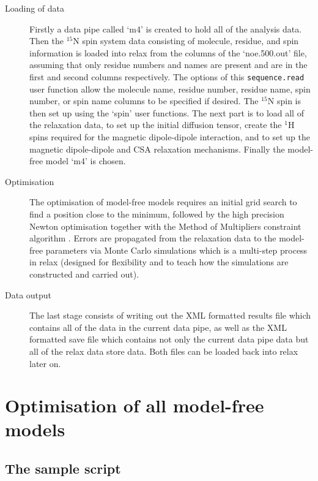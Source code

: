 \begin{htmlonly}
\begin{htmlonly}
\begin{description}
\item[Loading of data] Firstly a data pipe called `m4' is created to hold all of the analysis data.  Then the $^{15}$N spin system data consisting of molecule, residue, and spin information is loaded into relax from the columns of the `noe.500.out' file, assuming that only residue numbers and names are present and are in the first and second columns respectively.  The options of this \texttt{sequence.read} user function allow the molecule name, residue number, residue name, spin number, or spin name columns to be specified if desired.  The $^{15}$N spin is then set up using the `spin' user functions.  The next part is to load all of the relaxation data, to set up the initial diffusion tensor, create the $^1$H spins required for the magnetic dipole-dipole interaction, and to set up the magnetic dipole-dipole and CSA relaxation mechanisms.  Finally the model-free model `m4' is chosen.
\item[Optimisation] The optimisation of model-free models requires an initial grid search to find a position close to the minimum, followed by the high precision Newton optimisation together with the Method of Multipliers constraint algorithm \citep{dAuvergneGooley08a}.  Errors are propagated from the relaxation data to the model-free parameters via Monte Carlo simulations which is a multi-step process in relax (designed for flexibility and to teach how the simulations are constructed and carried out).
\item[Data output] The last stage consists of writing out the XML formatted results file which contains all of the data in the current data pipe, as well as the XML formatted save file which contains not only the current data pipe data but all of the relax data store data.  Both files can be loaded back into relax later on.
\end{description}




\section{Optimisation of all model-free models}



\subsection{The sample script}


\end{htmlonly}
\end{htmlonly}
